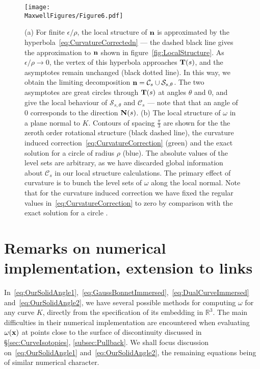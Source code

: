     \begin{figure}[htbp]
        \begin{centering}
            \texttt{[image: \\MaxwellFigures/Figure6.pdf]}
            \caption{(a) For finite $\epsilon/\rho$, the local structure of $\bf n$ is approximated by the hyperbola~\eqref{eq:CurvatureCorrectedn} --- the dashed black line gives the approximation to $\bf n$ shown in figure~\ref{fig:LocalStructure}. As $\epsilon /\rho \rightarrow 0$, the vertex of this hyperbola approaches ${\bf T}(s)$, and the asymptotes remain unchanged (black dotted line). In this way, we obtain the limiting decomposition ${\bf n} = \mathcal{C}_s \cup \mathcal{S}_{s,\theta}$. The two asymptotes are great circles through ${\bf T}(s)$ at angles $\theta$ and $0$, and give the local behaviour of $\mathcal{S}_{s,\theta}$ and $\mathcal{C}_s$ --- note that that an angle of $0$ corresponds to the direction ${\bf N}(s)$. (b) The local structure of $\omega$ in a plane normal to $K$. Contours of spacing $\frac{\pi}{3}$ are shown for the the zeroth order rotational structure (black dashed line), the curvature induced correction~\eqref{eq:CurvatureCorrection} (green) and the exact solution for a circle of radius $\rho$ (blue). The absolute values of the level sets are arbitrary, as we have discarded global information about $\mathcal{C}_s$ in our local structure calculations. The primary effect of curvature is to bunch the level sets of $\omega$ along the local normal. Note that for the curvature induced correction we have fixed the regular values in~\eqref{eq:CurvatureCorrection} to zero by comparison with the exact solution for a circle \citep{Saffman1992}.}
            \label{fig:CurvatureCorrections}
        \end{centering}
    \end{figure}

    \section{Remarks on numerical implementation, extension to links}
    \label{sec:NumericalImplementation}

    In~\eqref{eq:OurSolidAngle1},~\eqref{eq:GaussBonnetImmersed},~\eqref{eq:DualCurveImmersed} and~\eqref{eq:OurSolidAngle2}, we have several possible methods for computing $\omega$ for any curve $K$, directly from the specification of its embedding in $\mathbb{R}^3$. The main difficulties in their numerical implementation are encountered when evaluating $\omega(\bf x)$ at points close to the surface of discontinuity discussed in \S\ref{sec:CurveIsotopies}, \ref{subsec:Pullback}. We shall focus discussion on~\eqref{eq:OurSolidAngle1} and~\eqref{eq:OurSolidAngle2}, the remaining equations being of similar numerical character.

